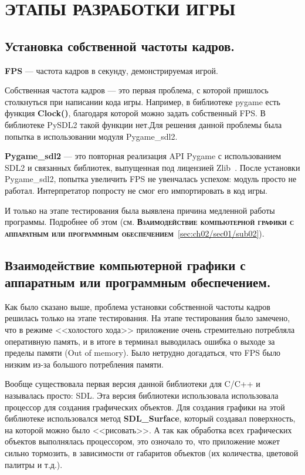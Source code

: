 \chapter{\label{ch:ch02}ЭТАПЫ РАЗРАБОТКИ ИГРЫ}

\section{\label{sec:ch02/sec01/sub01}Установка собственной частоты кадров.}
\textbf{FPS} --- частота кадров в секунду, демонстрируемая игрой.

Собственная частота кадров --- это первая проблема, с которой пришлось столкнуться при написании кода игры. Например, в библиотеке pygame есть функция \textbf{Clock()},
благодаря которой можно задать собственный FPS. В библиотеке PySDL2 такой функции нет.Для решения данной проблемы была попытка в использовании модуля Pygame\_sdl2.

\textbf{Pygame\_sdl2} --- это повторная реализация API Pygame с использованием SDL2 и связанных библиотек, выпущенная под лицензией Zlib~\cite{pgsdl2EN}.
После установки Pygame\_sdl2, попытка увеличить FPS не увенчалась успехом: модуль просто не работал. Интерпретатор попросту не смог его импортировать в код игры.

И только на этапе тестирования была выявлена причина медленной работы программы. 
Подробнее об этом (см. \textbf{\textsc{Взаимодействие компьютерной графики с аппаратным или программным обеспечением}}~\ref{sec:ch02/sec01/sub02}).

\section{\label{sec:ch02/sec01/sub02}Взаимодействие компьютерной графики с аппаратным или программным обеспечением.}
Как было сказано выше, проблема установки собственной частоты кадров решилась только на этапе тестирования. На этапе тестирования было замечено, что в режиме <<холостого хода>>
приложение очень стремительно потребляла оперативную память, и в итоге в терминал выводилась ошибка о выходе за пределы памяти (Out of memory). Было нетрудно догадаться,
что FPS было низким из-за большого потребления памяти.

Вообще существовала первая версия данной библиотеки для C/C++ и называлась просто: SDL. Эта версия библиотеки использовала использовала процессор для создания графических объектов.
Для создания графики на этой библиотеке использовался метод \textbf{SDL\_Surface}, который создавал поверхность, на которой можно было <<рисовать>>. А так как обработка всех графических объектов выполнялась процессором, это озночало то, что приложение может сильно тормозить, в зависимости от габаритов объектов (их количества, цветовой палитры и т.д.).

